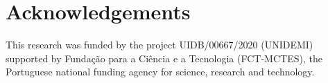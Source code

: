 \documentclass[3p,times,procedia]{elsarticle}
\begin{document}
\section*{Acknowledgements}

This research was funded by the project UIDB/00667/2020 (UNIDEMI) supported
by Fundação para a Ciência e a Tecnologia (FCT-MCTES), the Portuguese
national funding agency for science, research and technology.



%






\end{document}
